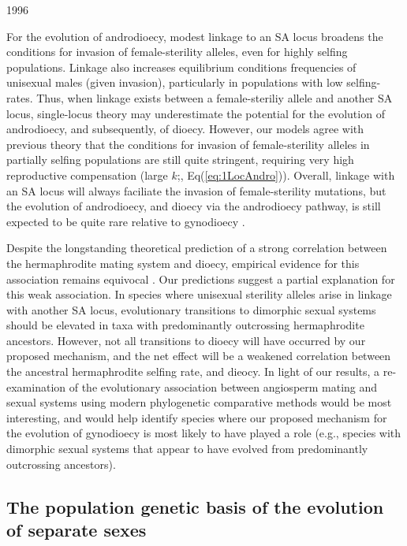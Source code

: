 1996\documentclass[9pt,twocolumn,twoside,lineno]{gsajnl}
\begin{document}
For the evolution of androdioecy, modest linkage to an SA locus broadens the conditions for invasion of female-sterility alleles, even for highly selfing populations. Linkage also increases equilibrium conditions frequencies of unisexual males (given invasion), particularly in populations with low selfing-rates. Thus, when linkage exists between a female-steriliy allele and another SA locus, single-locus theory may underestimate the potential for the evolution of androdioecy, and subsequently, of dioecy. However, our models agree with previous theory that the conditions for invasion of female-sterility alleles in partially selfing populations are still quite stringent, requiring very high reproductive compensation (large $k$;\citealt{Charlesworth1978a}, Eq(\ref{eq:1LocAndro})). Overall, linkage with an SA locus will always faciliate the invasion of female-sterility mutations, but the evolution of androdioecy, and dioecy via the androdioecy pathway, is still expected to be quite rare relative to gynodioecy \citep{Charlesworth1978a,Charlesworth2006,KaferPannell2017,Renner2014}.

Despite the longstanding theoretical prediction of a strong correlation between the hermaphrodite mating system and dioecy, empirical evidence for this association remains equivocal \citep{Charlesworth1985,Charlesworth2006,Renner2014}. Our predictions suggest a partial explanation for this weak association. In species where unisexual sterility alleles arise in linkage with another SA locus, evolutionary transitions to dimorphic sexual systems should be elevated in taxa with predominantly outcrossing hermaphrodite ancestors. However, not all transitions to dioecy will have occurred by our proposed mechanism, and the net effect will be a weakened correlation between the ancestral hermaphrodite selfing rate, and dieocy. In light of our results, a re-examination of the evolutionary association between angiosperm mating and sexual systems using modern phylogenetic comparative methods would be most interesting, and would help identify species where our proposed mechanism for the evolution of gynodioecy is most likely to have played a role (e.g., species with dimorphic sexual systems that appear to have evolved from predominantly outcrossing ancestors). 


\subsection{The population genetic basis of the evolution of separate sexes}
\end{document}
